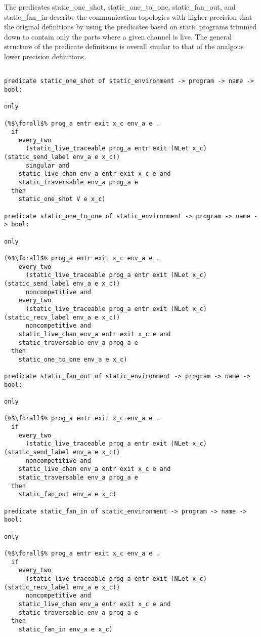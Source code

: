 \documentclass{article}
\begin{document}
The predicates static\_one\_shot, static\_one\_to\_one, static\_fan\_out, and static\_fan\_in describe
the communication topologies with higher precision that the original definitions by using the
predicates based on static programs trimmed down to contain only the parts where a given channel is
live. The general structure of the predicate definitions is overall similar to that of the
analgous lower precision definitions. 

\begin{lstlisting}[language=logic, escapechar=\%]

predicate static_one_shot of static_environment -> program -> name -> bool:

only

(%$\forall$% prog_a entr exit x_c env_a e . 
  if
    every_two
      (static_live_traceable prog_a entr exit (NLet x_c) (static_send_label env_a e x_c))
      singular and 
    static_live_chan env_a entr exit x_c e and 
    static_traversable env_a prog_a e
  then
    static_one_shot V e x_c)

predicate static_one_to_one of static_environment -> program -> name -> bool:

only

(%$\forall$% prog_a entr exit x_c env_a e .
    every_two
      (static_live_traceable prog_a entr exit (NLet x_c) (static_send_label env_a e x_c))
      noncompetitive and 
    every_two
      (static_live_traceable prog_a entr exit (NLet x_c) (static_recv_label env_a e x_c))
      noncompetitive and
    static_live_chan env_a entr exit x_c e and
    static_traversable env_a prog_a e
  then
    static_one_to_one env_a e x_c)

predicate static_fan_out of static_environment -> program -> name -> bool:

only

(%$\forall$% prog_a entr exit x_c env_a e .
  if
    every_two
      (static_live_traceable prog_a entr exit (NLet x_c) (static_send_label env_a e x_c))
      noncompetitive and
    static_live_chan env_a entr exit x_c e and
    static_traversable env_a prog_a e
  then
    static_fan_out env_a e x_c)

predicate static_fan_in of static_environment -> program -> name -> bool:

only

(%$\forall$% prog_a entr exit x_c env_a e .
  if
    every_two
      (static_live_traceable prog_a entr exit (NLet x_c) (static_recv_label env_a e x_c))
      noncompetitive and 
    static_live_chan env_a entr exit x_c e and
    static_traversable env_a prog_a e
  then
    static_fan_in env_a e x_c)


  \end{lstlisting}
\end{document}
